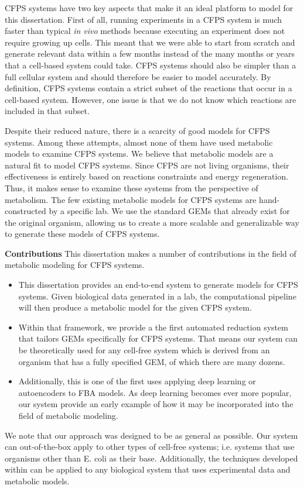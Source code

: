 CFPS systems have two key aspects that make it an ideal platform to model for this dissertation.
First of all, running experiments in a CFPS system is much faster than typical \textit{in vivo} methods because executing an experiment does not require growing up cells.
This meant that we were able to start from scratch and generate relevant data within a few months instead of the many months or years that a cell-based system could take.
CFPS systems should also be simpler than a full cellular system and should therefore be easier to model accurately.
By definition, CFPS systems contain a strict subset of the reactions that occur in a cell-based system.
However, one issue is that we do not know which reactions are included in that subset.

Despite their reduced nature, there is a scarcity of good models for CFPS systems.
Among these attempts, almost none of them have used metabolic models to examine CFPS systems.
We believe that metabolic models are a natural fit to model CFPS systems.
Since CFPS are not living organisms, their effectiveness is entirely based on reactions constraints and energy regeneration.
Thus, it makes sense to examine these systems from the perspective of metabolism.
The few existing metabolic models for CFPS systems are hand-constructed by a specific lab.
We use the standard GEMs that already exist for the original organism, allowing us to create a more scalable and generalizable way to generate these models of CFPS systems.

\textbf{Contributions}
This dissertation makes a number of contributions in the field of metabolic modeling for CFPS systems.
\begin{itemize}
\item This dissertation provides an end-to-end system to generate models for CFPS systems.
Given biological data generated in a lab, the computational pipeline will then produce a metabolic model for the given CFPS system.
\item Within that framework, we provide a the first automated reduction system that tailors GEMs specifically for CFPS systems.
That means our system can be theoretically used for any cell-free system which is derived from an organism that has a fully specified GEM, of which there are many dozens.
\item Additionally, this is one of the first uses applying deep learning or autoencoders to FBA models.
As deep learning becomes ever more popular, our system provide an early example of how it may be incorporated into the field of metabolic modeling.
\end{itemize}
We note that our approach was designed to be as general as possible.
Our system can out-of-the-box apply to other types of cell-free systems; i.e. systems that use organisms other than E. coli as their base.
Additionally, the techniques developed within can be applied to any biological system that uses experimental data and metabolic models.

